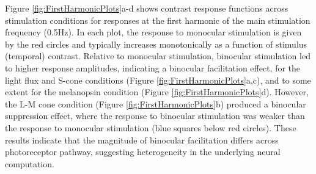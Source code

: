 \documentclass[
]{article}
\begin{document}
Figure \ref{fig:FirstHarmonicPlots}a-d shows contrast response functions across stimulation conditions for responses at the first harmonic of the main stimulation frequency (0.5Hz). In each plot, the response to monocular stimulation is given by the red circles and typically increases monotonically as a function of stimulus (temporal) contrast. Relative to monocular stimulation, binocular stimulation led to higher response amplitudes, indicating a binocular facilitation effect, for the light flux and S-cone conditions (Figure \ref{fig:FirstHarmonicPlots}a,c), and to some extent for the melanopsin condition (Figure \ref{fig:FirstHarmonicPlots}d). However, the L-M cone condition (Figure \ref{fig:FirstHarmonicPlots}b) produced a binocular suppression effect, where the response to binocular stimulation was weaker than the response to monocular stimulation (blue squares below red circles). These results indicate that the magnitude of binocular facilitation differs across photoreceptor pathway, suggesting heterogeneity in the underlying neural computation.
\end{document}
